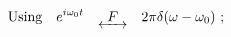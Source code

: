 \documentclass[preview]{standalone}
\begin{document}
\begin{align*}
\textrm{Using}& \quad e^{i\omega_{0} t} \quad \underleftrightarrow{ \ \ F \ \ } \quad 2\pi \delta(\omega - \omega_{0}) \ ; \\
\end{align*}
\end{document}
